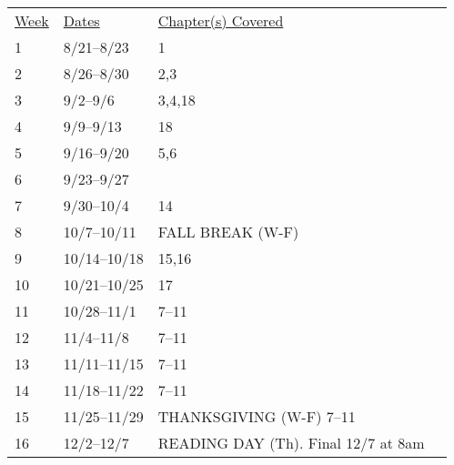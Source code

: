 \documentclass[10pt]{article}
\begin{document}
\begin{center}
\begin{tabular}{llll}
\underline{Week} & \underline{Dates} & \underline{Chapter(s) Covered}\\
1 & 8/21--8/23  & 1\\
2 & 8/26--8/30 & 2,3 \\
3 & 9/2--9/6 & 3,4,18\\
4 & 9/9--9/13  & 18\\
5 & 9/16--9/20 & 5,6\\
6 & 9/23--9/27 & \\
7 & 9/30--10/4 & 14\\
8 & 10/7--10/11 &  FALL BREAK (W-F)  \\
9 & 10/14--10/18 & 15,16 \\
10 & 10/21--10/25  & 17 \\
11 & 10/28--11/1 & 7--11\\
12 & 11/4--11/8 &  7--11\\
13 & 11/11--11/15 & 7--11\\
14 & 11/18--11/22 & 7--11\\
15 & 11/25--11/29 & THANKSGIVING (W-F) 7--11\\
16 & 12/2--12/7 & READING DAY (Th). Final 12/7 at 8am \\
\end{tabular}
\end{center}
\end{document}
